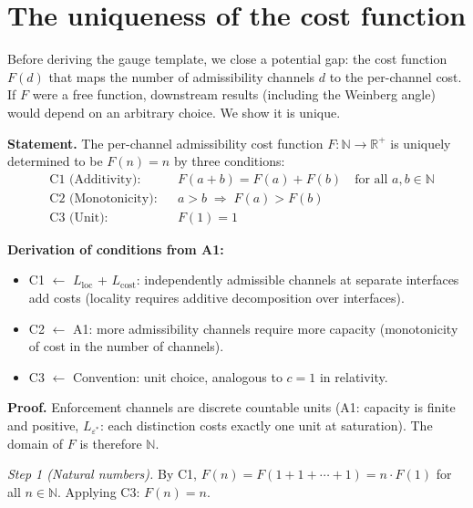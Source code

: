 \documentclass[11pt]{article}
\newenvironment{varlist}{\begin{itemize}[nosep,leftmargin=2em]}{\end{itemize}}
\begin{document}
\section{The uniqueness of the cost function}
\label{sec:cauchy}

Before deriving the gauge template, we close a potential gap: the cost function $F(d)$ that maps the number of admissibility channels $d$ to the per-channel cost.  If $F$ were a free function, downstream results (including the Weinberg angle) would depend on an arbitrary choice.  We show it is unique.

\begin{tcolorbox}[apfbox, title={Lemma $L_{\mathrm{Cauchy}}$ (Cost Function Uniqueness)}]
\textbf{Statement.}  The per-channel admissibility cost function $F: \mathbb{N} \to \mathbb{R}^+$ is uniquely determined to be $F(n) = n$ by three conditions:
\begin{align}
&\text{C1 (Additivity):} &&F(a + b) = F(a) + F(b) \quad \text{for all } a, b \in \mathbb{N} \label{eq:C1}\\
&\text{C2 (Monotonicity):} &&a > b \;\Rightarrow\; F(a) > F(b) \label{eq:C2}\\
&\text{C3 (Unit):} &&F(1) = 1 \label{eq:C3}
\end{align}

\smallskip\noindent\textbf{Derivation of conditions from A1:}
\begin{varlist}
\item C1 $\leftarrow$ $L_{\mathrm{loc}}$ + $L_{\mathrm{cost}}$: independently admissible channels at separate interfaces add costs (locality requires additive decomposition over interfaces).
\item C2 $\leftarrow$ A1: more admissibility channels require more capacity (monotonicity of cost in the number of channels).
\item C3 $\leftarrow$ Convention: unit choice, analogous to $c = 1$ in relativity.
\end{varlist}

\smallskip\noindent\textbf{Proof.}  Enforcement channels are discrete countable units (A1: capacity is finite and positive, $L_{\varepsilon^*}$: each distinction costs exactly one unit at saturation).  The domain of $F$ is therefore $\mathbb{N}$.

\textit{Step 1 (Natural numbers).}  By C1, $F(n) = F(1 + 1 + \cdots + 1) = n \cdot F(1)$ for all $n \in \mathbb{N}$.  Applying C3: $F(n) = n$.


\end{tcolorbox}
\end{document}
